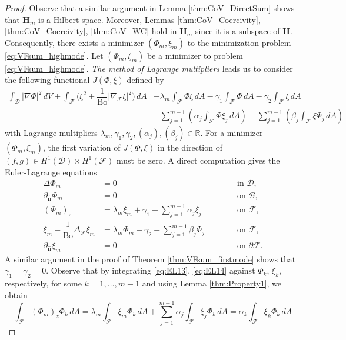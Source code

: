 \documentclass[letterpaper, 12pt]{amsart}
\newcommand{\bond}{\mathrm{Bo}}
\newcommand{\R}{\mathbb{R}}
\renewcommand{\H}{\mathbf{H}}
\newcommand{\D}{\mathcal{D}}
\newcommand{\B}{\mathcal{B}}
\newcommand{\F}{\mathcal{F}}
\newcommand{\n}{\mathbf{\hat{n}}}
\begin{document}
\begin{proof}
Observe that a similar argument in Lemma \ref{thm:CoV_DirectSum} shows that $\H_m$ is a Hilbert space. Moreover, Lemmas \ref{thm:CoV_Coercivity}, \ref{thm:CoV_Coercivity}, \ref{thm:CoV_WC} hold in $\H_m$ since it is a subspace of $\H$. Consequently, there exists a minimizer $(\Phi_m, \xi_m)$ to the minimization problem \eqref{eq:VFsum_highmode}. Let $(\Phi_m,\xi_m)$ be a minimizer to problem \eqref{eq:VFsum_highmode}. \emph{The method of Lagrange multipliers} leads us to consider the following functional $J(\Phi,\xi)$ defined by
\begin{align*}
\int_\D |\nabla\Phi|^2\, dV + \int_\F \Big(\xi^2 + \dfrac{1}{\bond}|\nabla_\F\xi|^2\Big)\, dA & - \lambda_m\int_\F \Phi\xi\, dA - \gamma_1\int_\F\Phi\, dA - \gamma_2\int_\F\xi\, dA\\
& - \sum_{j=1}^{m-1} \left(\alpha_j\int_\F \Phi\xi_j\, dA\right) - \sum_{j=1}^{m-1} \left(\beta_j\int_\F \xi\Phi_j\, dA\right)
\end{align*}
with Lagrange multipliers $\lambda_m, \gamma_1, \gamma_2, (\alpha_j), (\beta_j)\in\R$. For  a minimizer $(\Phi_m,\xi_m)$, the first variation of $J(\Phi,\xi)$ in the direction of $(f,g)\in H^1(\D)\times H^1(\F)$ must be zero. 
A direct computation gives the Euler-Lagrange equations
\begin{subequations}
\begin{alignat}{3}
\label{eq:EL11} \Delta\Phi_m & = 0 && \qquad\textrm{ in }\D,  \\
\label{eq:EL12} \partial_\n\Phi_m & = 0 && \qquad\textrm{ on }\B, \\
\label{eq:EL13} (\Phi_m)_z & = \lambda_m\xi_m + \gamma_1 + \sum_{j=1}^{m-1} \alpha_j\xi_j && \qquad\textrm{ on }\F, \\
\label{eq:EL14} \xi_m - \dfrac{1}{\bond}\Delta_\F\xi_m & = \lambda_m\Phi_m + \gamma_2 + \sum_{j=1}^{m-1} \beta_j\Phi_j && \qquad\textrm{ on }\F, \\
\label{eq:EL15} \partial_\n\xi_m & = 0 && \qquad\textrm{ on }\partial\F.
\end{alignat}
\end{subequations}
A similar argument in the proof of Theorem \eqref{thm:VFsum_firstmode} shows that $\gamma_1=\gamma_2=0$. Observe that by integrating \eqref{eq:EL13}, \eqref{eq:EL14} against $\Phi_k$, $\xi_k$, respectively, for some $k=1,\ldots,m-1$ and using Lemma \ref{thm:Property1}, we obtain
\[
\int_\F (\Phi_m)_z\Phi_k\, dA  = \lambda_m {\int_\F\xi_m\Phi_k\, dA} + \sum_{j=1}^{m-1}\alpha_j\int_\F \xi_j\Phi_k\, dA  = \alpha_k\int_\F\xi_k\Phi_k\, dA  \]

\end{proof}
\end{document}
